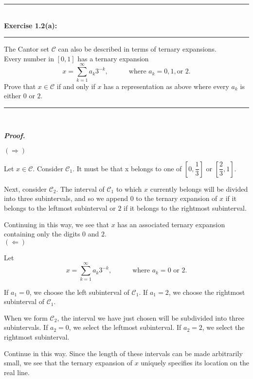 \documentclass[a4paper,11pt]{article}
\begin{document}
\begin{flushleft}
	\rule[-0.5ex]{17cm}{2pt}\\
		\textbf{Exercise 1.2(a):}\\
	\rule[1.5ex]{17cm}{0.5pt}
		The Cantor set $\mathcal{C}$ can also be described in terms of ternary expansions.\\

		Every number in $[0,1]$ has a ternary expansion
			$$x = \overset{\infty}{\underset{k = 1}{\sum}} a_k 3^{-k},
			\quad \quad \quad \text{where } a_k = 0, 1, \text{or }2.$$
		Prove that $x \in \mathcal{C}$ if and only if $x$ has a representation as above where every $a_k$ is either $0$ or $2$.
	\rule[1.0ex]{17cm}{0.5pt}\
\end{flushleft}

\textbf{\textit{Proof.}}

$(\Rightarrow)$

Let $x \in \mathcal{C}$. Consider $\mathcal{C}_1$. It must
be that x belongs to one of $[0,\dfrac{1}{3}]$ or $[\dfrac{2}{3}, 1]$.

Next, consider $\mathcal{C}_2$. The interval of $\mathcal{C}_1$ to which $x$ currently belongs will be divided into three subintervals, and so we append $0$ to the ternary expansion of $x$ if it belongs to the leftmost subinterval or $2$ if it belongs to the rightmost subinterval. 

Continuing in this way, we see that $x$ has an associated ternary expansion containing only the digits $0$ and $2$.\\

$(\Leftarrow)$

Let
	$$x = \overset{\infty}{\underset{k = 1}{\sum}} a_k 3^{-k},
	\quad \quad \quad \text{where } a_k = 0\text{ or }2.$$

If $a_1 = 0$, we choose the left subinterval of $\mathcal{C}_1$. If $a_1 = 2$, we choose the rightmost subinterval of $\mathcal{C}_1$.

When we form $\mathcal{C}_2$, the interval we have just chosen will be subdivided into three subintervals. If $a_2 = 0$, we select the leftmost subinterval. If $a_2 = 2$, we select the rightmost subinterval.

Continue in this way. Since the length of these intervals can be made arbitrarily small, we see that the ternary expansion of $x$ uniquely specifies its location on the real line.\\\\
\end{document}

